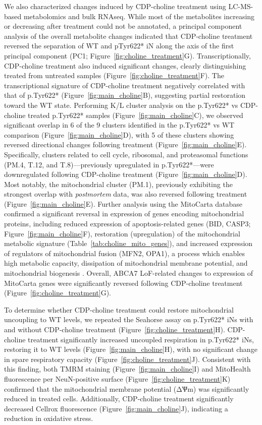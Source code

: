 We also characterized changes induced by CDP-choline treatment using LC-MS-based metabolomics and bulk RNAseq. While most of the metabolites increasing or decreasing after treatment could not be annotated, a principal component analysis of the overall metabolite changes indicated that CDP-choline treatment reversed the separation of WT and pTyr622* iN along the axis of the first principal component (PC1; Figure~\ref{fig:choline_treatment}G). Transcriptionally, CDP-choline treatment also induced significant changes, clearly distinguishing treated from untreated samples (Figure~\ref{fig:choline_treatment}F). The transcriptional signature of CDP-choline treatment negatively correlated with that of p.Tyr622* (Figure~\ref{fig:main_choline}B), suggesting partial restoration toward the WT state. Performing K/L cluster analysis on the p.Tyr622* vs CDP-choline treated p.Tyr622* samples (Figure~\ref{fig:main_choline}C), we observed significant overlap in 6 of the 9 clusters identified in the p.Tyr622* vs WT comparison (Figure~\ref{fig:main_choline}D), with 5 of these clusters showing reversed directional changes following treatment (Figure~\ref{fig:main_choline}E). Specifically, clusters related to cell cycle, ribosomal, and proteasomal functions (PM.4, T.12, and T.8)—previously upregulated in p.Tyr622*—were downregulated following CDP-choline treatment (Figure~\ref{fig:main_choline}D). Most notably, the mitochondrial cluster (PM.1), previously exhibiting the strongest overlap with \textit{postmortem} data, was also reversed following treatment (Figure~\ref{fig:main_choline}E). Further analysis using the MitoCarta database confirmed a significant reversal in expression of genes encoding mitochondrial proteins, including reduced expression of apoptosis-related genes (BID, CASP3; Figure~\ref{fig:main_choline}F), restoration (upregulation) of the mitochondrial metabolic signature (Table~\ref{tab:choline_mito_genes}), and increased expression of regulators of mitochondrial fusion (MFN2, OPA1), a process which enables high metabolic capacity, dissipation of mitochondrial membrane potential, and mitochondrial biogenesis \cite{Westermann2010-au}. Overall, ABCA7 LoF-related changes to expression of MitoCarta genes were significantly reversed following CDP-choline treatment (Figure~\ref{fig:choline_treatment}G). 

To determine whether CDP-choline treatment could restore mitochondrial uncoupling to WT levels, we repeated the Seahorse assay on p.Tyr622* iNs with and without CDP-choline treatment (Figure~\ref{fig:choline_treatment}H). CDP-choline treatment significantly increased uncoupled respiration in p.Tyr622* iNs, restoring it to WT levels (Figure~\ref{fig:main_choline}H), with no significant change in spare respiratory capacity (Figure~\ref{fig:choline_treatment}J). Consistent with this finding, both TMRM staining (Figure~\ref{fig:main_choline}I) and MitoHealth fluorescence per NeuN-positive surface (Figure~\ref{fig:choline_treatment}K) confirmed that the mitochondrial membrane potential (ΔѰm) was significantly reduced in treated cells. Additionally, CDP-choline treatment significantly decreased Cellrox fluorescence (Figure~\ref{fig:main_choline}J), indicating a reduction in oxidative stress. 

